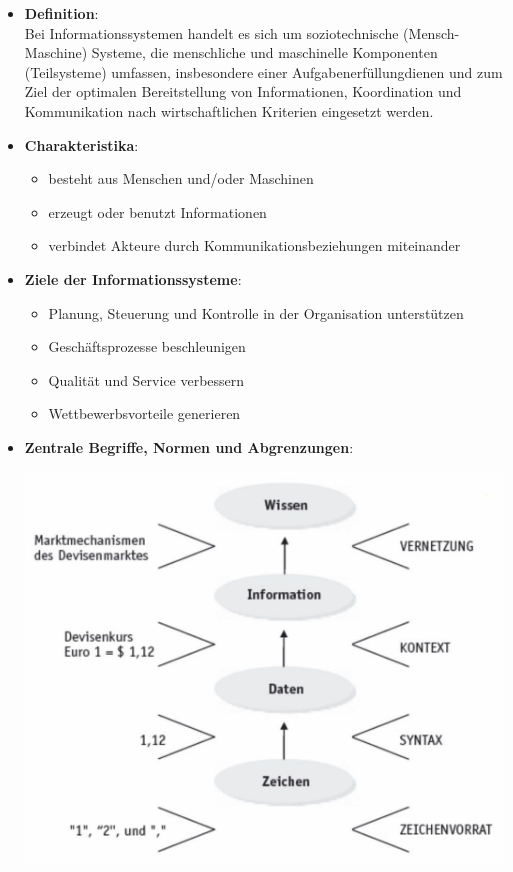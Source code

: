 \documentclass[12pt,a4paper]{article}
\begin{document}
\begin{itemize}
   \item \textbf{Definition}:\\
         Bei Informationssystemen handelt es sich um soziotechnische (Mensch-Maschine) Systeme, die menschliche und maschinelle Komponenten (Teilsysteme) umfassen, insbesondere einer Aufgabenerfüllungdienen und zum Ziel der optimalen Bereitstellung von Informationen, Koordination und Kommunikation nach wirtschaftlichen Kriterien eingesetzt werden.

   \item \textbf{Charakteristika}:
      \begin{itemize}
         \item besteht aus Menschen und/oder Maschinen
         \item erzeugt oder benutzt Informationen
         \item verbindet Akteure durch Kommunikationsbeziehungen miteinander
      \end{itemize}
         
   \item \textbf{Ziele der Informationssysteme}:
			\begin{itemize}
			    \item Planung, Steuerung und Kontrolle in der Organisation unterstützen
			    \item Geschäftsprozesse beschleunigen
			    \item Qualität und Service verbessern
			    \item Wettbewerbsvorteile generieren
			\end{itemize}
   
   \item \textbf{Zentrale Begriffe, Normen und Abgrenzungen}:
         \begin{center}
            \includegraphics[scale=0.6]{ZentraleBegriffe-Normen-Abgrenzungen.jpg}
         \end{center}


\end{itemize}
\end{document}
